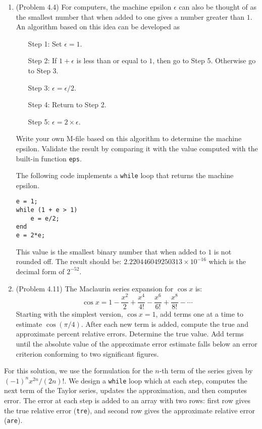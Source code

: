 \documentclass[12pt]{amsart}
\begin{document}
\begin{enumerate}
\vspace{1cm}
\item (Problem 4.4) For computers, the machine epsilon
$\epsilon$ can also be thought of as the smallest number that
when added to one gives a number greater than $1$. An algorithm
based on this idea can be developed as
\begin{itemize}
\item[Step 1:] Set $\epsilon = 1$.
\item[Step 2:] If $1 + \epsilon$ is less than or equal to $1$, then
go to Step 5. Otherwise go to Step 3.
\item[Step 3:] $\epsilon = \epsilon/2$.
\item[Step 4:] Return to Step 2.
\item[Step 5:] $\epsilon = 2 \times \epsilon$.
\end{itemize}
Write your own M-file based on this algorithm to determine
the machine epsilon. Validate the result by comparing it with
the value computed with the built-in function {\tt eps}.

\vspace{1cm}

The following code implements a {\tt while} loop that returns
the machine epsilon.

\begin{verbatim}
e = 1;
while (1 + e > 1)
    e = e/2;
end
e = 2*e;
\end{verbatim}

This value is the smallest binary number that when added to $1$
is not rounded off. The result should be: $2.220446049250313 \times 10^{-16}$
which is the decimal form of $2^{-52}$.
\vspace{1cm}

\item (Problem 4.11) The Maclaurin series expansion
for $\cos x$ is:
\[ \cos x = 1 - \dfrac{x^2}{2} + \dfrac{x^4}{4!} - \dfrac{x^6}{6!}
+ \dfrac{x^8}{8!} - \cdots \]
Starting with the simplest version, $\cos x = 1$, add terms one
at a time to estimate $\cos(\pi/4)$. After each new term is added,
compute the true and approximate percent relative errors.
Determine the true value. Add terms until the absolute value of
the approximate error estimate falls below an error criterion
conforming to two significant figures.

\end{enumerate}

\vspace{1cm}

For this solution, we use the formulation for the $n$-th term of
the series given by $(-1)^n x^{2n} / (2n)!$. We design a {\tt while}
loop which at each step, computes the next term of the Taylor series,
updates the approximation, and then computes error. The error at each
step is added to an array with two rows: first row gives the true relative
error ({\tt tre}), and second row gives the approximate relative error ({\tt are}).
\end{document}
